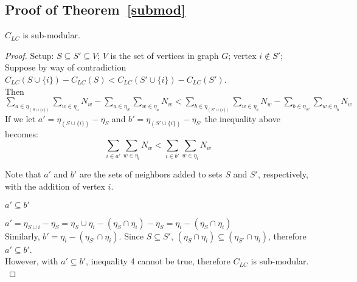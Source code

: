 \subsection{Proof of Theorem~\ref{submod}}
$C_{LC}$ is sub-modular.
\begin{proof} 
Setup: $S \subseteq S' \subseteq V$; $V$ is the set of vertices in graph $G$; vertex $i \notin S'$; \\

Suppose by way of contradiction $C_{LC}(S \cup \{i\}) - C_{LC}(S) < C_{LC}(S' \cup \{i\}) - C_{LC}(S')$. \\

Then $\sum_{a \in \eta_{(S \cup \{i\})}} \sum_{w \in \eta_a} N_w - \sum_{a \in \eta_S} \sum_{w \in \eta_a} N_w <  \sum_{b \in  \eta_{(S' \cup \{i\})}} \sum_{w \in \eta_b} N_w - \sum_{b \in \eta_{S'}} \sum_{w \in \eta_b} N_w$\\

If we let $a' =  \eta_{(S \cup \{i\})} - \eta_S$ and $b' =  \eta_{(S' \cup \{i\})} - \eta_{S'}$ the inequality above becomes: \\

\begin{equation}\sum_{i \in a'} \sum_{w \in \eta_i} N_w < \sum_{i \in b'} \sum_{w \in \eta_i} N_w \end{equation}

Note that $a'$ and $b'$ are the sets of neighbors added to sets $S$ and $S'$, respectively, with the addition of vertex $i$.

\begin{Claim} $a' \subseteq b'$ \end{Claim}
$a' = \eta_{S \cup {i}} - \eta_{S} = \eta_{S} \cup \eta_{{i}} - (\eta_{S} \cap \eta_{{i}}) - \eta_{S} =  \eta_{{i}} - (\eta_{S} \cap \eta_{{i}})$ \\
Similarly, $b' =   \eta_{{i}} - (\eta_{S'} \cap \eta_{{i}})$. Since $S \subseteq S'$, $(\eta_{S} \cap \eta_{{i}}) \subseteq  (\eta_{S'} \cap \eta_{{i}})$, therefore $a' \subseteq b'$.\\

However, with $a' \subseteq b'$, inequality 4 cannot be true, therefore $C_{LC}$ is sub-modular. \\  \end{proof}


